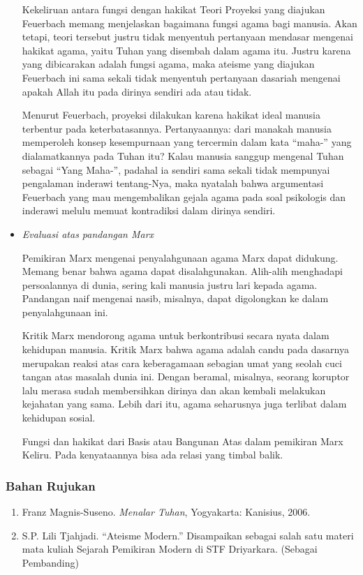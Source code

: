 \documentclass[10pt,a4paper]{article}
\def\tightlist{}
\begin{document}
\begin{multicols}{2}
\begin{itemize}
  Kekeliruan antara fungsi dengan hakikat Teori Proyeksi yang diajukan
  Feuerbach memang menjelaskan bagaimana fungsi agama bagi manusia. Akan
  tetapi, teori tersebut justru tidak menyentuh pertanyaan mendasar
  mengenai hakikat agama, yaitu Tuhan yang disembah dalam agama itu.
  Justru karena yang dibicarakan adalah fungsi agama, maka ateisme yang
  diajukan Feuerbach ini sama sekali tidak menyentuh pertanyaan dasariah
  mengenai apakah Allah itu pada dirinya sendiri ada atau tidak.

  Menurut Feuerbach, proyeksi dilakukan karena hakikat ideal manusia
  terbentur pada keterbatasannya. Pertanyaannya: dari manakah manusia
  memperoleh konsep kesempurnaan yang tercermin dalam kata ``maha-''
  yang dialamatkannya pada Tuhan itu? Kalau manusia sanggup mengenal
  Tuhan sebagai ``Yang Maha-'', padahal ia sendiri sama sekali tidak
  mempunyai pengalaman inderawi tentang-Nya, maka nyatalah bahwa
  argumentasi Feuerbach yang mau mengembalikan gejala agama pada soal
  psikologis dan inderawi melulu memuat kontradiksi dalam dirinya
  sendiri.
\item
  \emph{Evaluasi atas pandangan Marx}

  Pemikiran Marx mengenai penyalahgunaan agama Marx dapat didukung.
  Memang benar bahwa agama dapat disalahgunakan. Alih-alih menghadapi
  persoalannya di dunia, sering kali manusia justru lari kepada agama.
  Pandangan naif mengenai nasib, misalnya, dapat digolongkan ke dalam
  penyalahgunaan ini.

  Kritik Marx mendorong agama untuk berkontribusi secara nyata dalam
  kehidupan manusia. Kritik Marx bahwa agama adalah candu pada dasarnya
  merupakan reaksi atas cara keberagamaan sebagian umat yang seolah cuci
  tangan atas masalah dunia ini. Dengan beramal, misalnya, seorang
  koruptor lalu merasa sudah membersihkan dirinya dan akan kembali
  melakukan kejahatan yang sama. Lebih dari itu, agama seharusnya juga
  terlibat dalam kehidupan sosial.

  Fungsi dan hakikat dari Basis atau Bangunan Atas dalam pemikiran Marx
  Keliru. Pada kenyataannya bisa ada relasi yang timbal balik.
\end{itemize}

\hypertarget{bahan-rujukan}{%
\subsubsection{Bahan Rujukan}\label{bahan-rujukan}}

\begin{enumerate}
\def\labelenumi{\arabic{enumi}.}
\tightlist
\item
  Franz Magnis-Suseno. \emph{Menalar Tuhan}, Yogyakarta: Kanisius, 2006.
\item
  S.P. Lili Tjahjadi. ``Ateisme Modern.'' Disampaikan sebagai salah satu
  materi mata kuliah Sejarah Pemikiran Modern di STF Driyarkara.
  (Sebagai Pembanding)
\end{enumerate}


\end{multicols}
\end{document}

